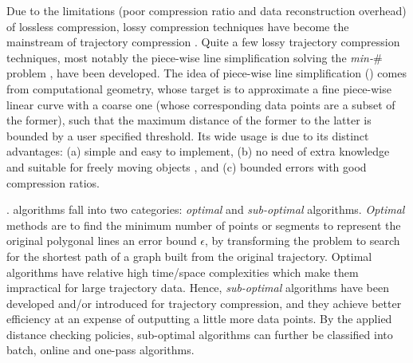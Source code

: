 Due to the  limitations (poor compression ratio and data reconstruction overhead) of lossless compression, lossy compression techniques have become the mainstream of trajectory compression \cite{Lin:Operb,Zhang:Evaluation}. Quite a few lossy trajectory compression techniques, most notably the piece-wise line simplification \cite{Douglas:Peucker, Hershberger:Speeding, Keogh:online,Liu:BQS, Muckell:Compression, Chen:Trajectory, Chen:Fast, Cao:Spatio, Shi:Survey} solving the \emph{min-$\#$} problem \cite{Chan:Optimal, Imai:Optimal,Pavlidis:Segment}, have been developed. The idea of piece-wise line simplification (\lsa) comes from computational geometry, whose target is to approximate a fine piece-wise linear curve with a coarse one (whose corresponding data points are a subset of the former), such that the maximum distance of the former to the latter is bounded by a user specified threshold. Its wide usage is due to its distinct advantages: (a) simple and easy to implement, (b) no need of extra knowledge and suitable for freely  moving  objects \cite{Popa:Spatio}, and (c) bounded errors with good compression ratios.

%


. \lsa algorithms fall into two categories: \textit{optimal} and \textit{sub-optimal} algorithms.
\textit{Optimal} methods\cite{Imai:Optimal,Chan:Optimal} are to find the minimum number of points or segments to represent the original polygonal lines \wrt an error bound $\epsilon$, by transforming the problem to search for the shortest path of a graph built from the original trajectory.
Optimal \lsa algorithms have relative high time/space complexities which make them impractical for large trajectory data.
Hence, \textit{sub-optimal} \lsa algorithms have been developed and/or introduced for trajectory compression, and they achieve better efficiency at an expense of outputting a little more data points. By the applied distance checking policies, sub-optimal algorithms can further be classified into
batch, online and one-pass algorithms.

